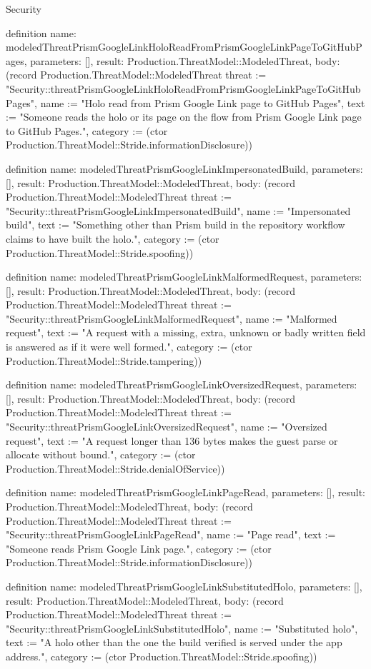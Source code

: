 \begin{lexlean}{Security}
\begin{semanticmodule}
definition{
  name: modeledThreatPrismGoogleLinkHoloReadFromPrismGoogleLinkPageToGitHubPages,
  parameters: [],
  result: Production.ThreatModel::ModeledThreat,
  body: (record Production.ThreatModel::ModeledThreat {threat := "Security::threatPrismGoogleLinkHoloReadFromPrismGoogleLinkPageToGitHubPages", name := "Holo read from Prism Google Link page to GitHub Pages", text := "Someone reads the holo or its page on the flow from Prism Google Link page to GitHub Pages.", category := (ctor Production.ThreatModel::Stride.informationDisclosure)})
}

definition{
  name: modeledThreatPrismGoogleLinkImpersonatedBuild,
  parameters: [],
  result: Production.ThreatModel::ModeledThreat,
  body: (record Production.ThreatModel::ModeledThreat {threat := "Security::threatPrismGoogleLinkImpersonatedBuild", name := "Impersonated build", text := "Something other than Prism build in the repository workflow claims to have built the holo.", category := (ctor Production.ThreatModel::Stride.spoofing)})
}

definition{
  name: modeledThreatPrismGoogleLinkMalformedRequest,
  parameters: [],
  result: Production.ThreatModel::ModeledThreat,
  body: (record Production.ThreatModel::ModeledThreat {threat := "Security::threatPrismGoogleLinkMalformedRequest", name := "Malformed request", text := "A request with a missing, extra, unknown or badly written field is answered as if it were well formed.", category := (ctor Production.ThreatModel::Stride.tampering)})
}

definition{
  name: modeledThreatPrismGoogleLinkOversizedRequest,
  parameters: [],
  result: Production.ThreatModel::ModeledThreat,
  body: (record Production.ThreatModel::ModeledThreat {threat := "Security::threatPrismGoogleLinkOversizedRequest", name := "Oversized request", text := "A request longer than 136 bytes makes the guest parse or allocate without bound.", category := (ctor Production.ThreatModel::Stride.denialOfService)})
}

definition{
  name: modeledThreatPrismGoogleLinkPageRead,
  parameters: [],
  result: Production.ThreatModel::ModeledThreat,
  body: (record Production.ThreatModel::ModeledThreat {threat := "Security::threatPrismGoogleLinkPageRead", name := "Page read", text := "Someone reads Prism Google Link page.", category := (ctor Production.ThreatModel::Stride.informationDisclosure)})
}

definition{
  name: modeledThreatPrismGoogleLinkSubstitutedHolo,
  parameters: [],
  result: Production.ThreatModel::ModeledThreat,
  body: (record Production.ThreatModel::ModeledThreat {threat := "Security::threatPrismGoogleLinkSubstitutedHolo", name := "Substituted holo", text := "A holo other than the one the build verified is served under the app address.", category := (ctor Production.ThreatModel::Stride.spoofing)})
}


\end{semanticmodule}
\end{lexlean}
